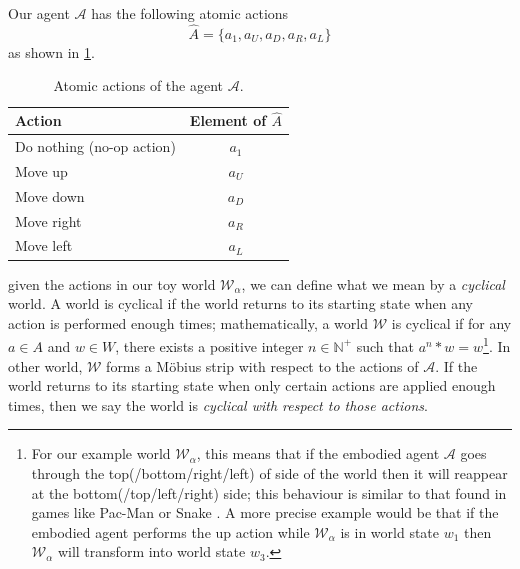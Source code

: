 Our agent $\mathscr{A}$ has the following atomic actions
\begin{equation}
    \hat{A} = \{ a_{1}, a_{U}, a_{D}, a_{R}, a_{L} \}
\end{equation}
as shown in \cref{tab:actions_of_agent_2_by_2_cyclical}.
\begin{table}[H]
    \centering
    \begin{tabular}{l|c}
        \hline
        Action                    & Element of $\hat{A}$ \\
        \hline
        Do nothing (no-op action) & $a_{1}$ \\
        Move up                   & $a_{U}$ \\
        Move down                 & $a_{D}$ \\
        Move right                & $a_{R}$ \\
        Move left                 & $a_{L}$
    \end{tabular}
    \caption{
    Atomic actions of the agent $\mathscr{A}$.
    }
    \label{tab:actions_of_agent_2_by_2_cyclical}
\end{table}

 given the actions in our toy world $\mathscr{W}_{\alpha}$, we can define what we mean by a \emph{cyclical} world.
A world is cyclical if the world returns to its starting state when any action is performed enough times; mathematically, a world $\mathscr{W}$ is cyclical if for any $a \in A$ and $w \in W$, there exists a positive integer $n \in \mathbb{N}^{+}$ such that $a^{n} \ast w = w$\footnote{
    For our example world $\mathscr{W}_{\alpha}$, this means that if the embodied agent $\mathscr{A}$ goes through the top(/bottom/right/left) of side of the world then it will reappear at the bottom(/top/left/right) side; this behaviour is similar to that found in games like Pac-Man  or Snake .
    A more precise example would be that if the embodied agent performs the up action while $\mathscr{W}_{\alpha}$ is in world state $w_{1}$ then $\mathscr{W}_{\alpha}$ will transform into world state $w_{3}$.
}.
In other world, $\mathscr{W}$ forms a Möbius strip with respect to the actions of $\mathscr{A}$.
If the world returns to its starting state when only certain actions are applied enough times, then we say the world is \emph{cyclical with respect to those actions}.

